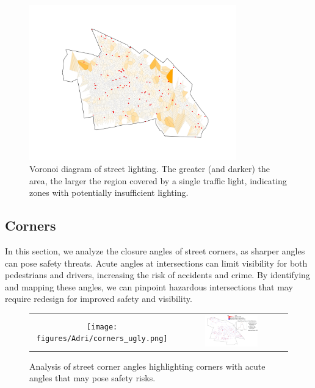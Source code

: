 \begin{figure}
\centering
\includegraphics[width=0.8\textwidth]{figures/Adri/lighting_voronoi.png}
\caption{Voronoi diagram of street lighting. The greater (and darker) the area, the larger the region covered by a single traffic light, indicating zones with potentially insufficient lighting.}
\label{fig
}
\end{figure}

\subsection{Corners}
In this section, we analyze the closure angles of street corners, as sharper angles can pose safety threats. Acute angles at intersections can limit visibility for both pedestrians and drivers, increasing the risk of accidents and crime. By identifying and mapping these angles, we can pinpoint hazardous intersections that may require redesign for improved safety and visibility.

\begin{figure}
\centering
\begin{tabular}{cc}
\texttt{[image: figures/Adri/corners\_ugly.png]}& \includegraphics[width=0.5\textwidth]{figures/Adri/corners_nougly.png}
\end{tabular}
\caption{Analysis of street corner angles highlighting corners with acute angles that may pose safety risks.}
\label{fig
}
\end{figure}
